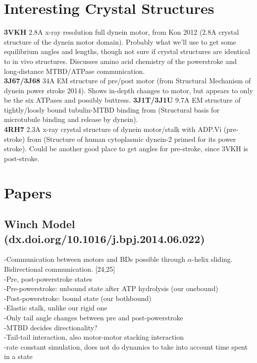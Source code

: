 \documentclass[10pt]{article} %
\begin{document}
\section{Interesting Crystal Structures}
\textbf{3VKH} 2.8A x-ray resolution full dynein motor, from Kon 2012 (2.8A crystal structure of the dynein motor domain). Probably what we'll use to get some equilibrium angles and lengths, though not sure if crystal structures are identical to in vivo structures. Discusses amino acid chemistry of the powerstroke and long-distance MTBD/ATPase communication.\\
\textbf{3J67/3J68} 34A EM structure of pre/post motor (from Structural Mechanism of dynein power stroke 2014). Shows in-depth changes to motor, but appears to only be the six ATPases and possibly buttress.
\textbf{3J1T/3J1U} 9.7A EM structure of tightly/loosly bound tubulin-MTBD binding from (Structural basis for microtubule binding and release by dynein).\\
\textbf{4RH7} 2.3A x-ray crystal structure of dynein motor/stalk with ADP.Vi (pre-stroke) from (Structure of human cytoplasmic dynein-2 primed for its power stroke). Could be another good place to get angles for pre-stroke, since 3VKH is post-stroke.\\

\section{Papers}
\subsection{Winch Model (dx.doi.org/10.1016/j.bpj.2014.06.022)}
-Communication between motors and BDs possible through $\alpha$-helix sliding. Bidirectional communication. [24,25]\\
-Pre, post-powerstroke states\\
-Pre-powerstroke: unbound state after ATP hydrolysis (our onebound)\\
-Post-powerstroke: bound state (our bothbound)\\
-Elastic stalk, unlike our rigid one\\
-Only tail angle changes between pre and post-powerstroke\\
-MTBD decides directionality?\\
-Tail-tail interaction, also motor-motor stacking interaction\\
-rate constant simulation, does not do dynamics to take into account time spent in a state\\
\end{document}

